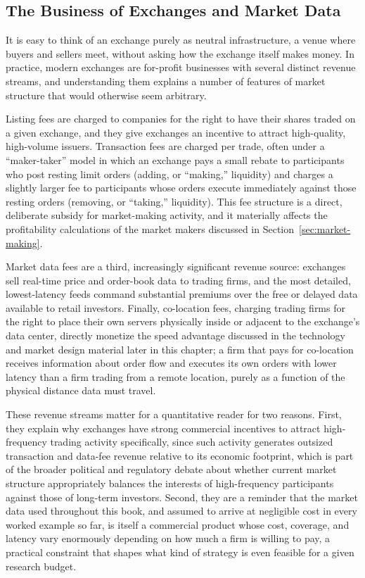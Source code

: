\documentclass[../ai_in_finance]{subfiles}
\begin{document}
\subsection{The Business of Exchanges and Market Data}

It is easy to think of an exchange purely as neutral infrastructure, a venue where buyers and sellers meet, without asking how the exchange itself makes money. In practice, modern exchanges are for-profit businesses with several distinct revenue streams, and understanding them explains a number of features of market structure that would otherwise seem arbitrary.

Listing fees are charged to companies for the right to have their shares traded on a given exchange, and they give exchanges an incentive to attract high-quality, high-volume issuers. Transaction fees are charged per trade, often under a ``maker-taker'' model in which an exchange pays a small rebate to participants who post resting limit orders (adding, or ``making,'' liquidity) and charges a slightly larger fee to participants whose orders execute immediately against those resting orders (removing, or ``taking,'' liquidity). This fee structure is a direct, deliberate subsidy for market-making activity, and it materially affects the profitability calculations of the market makers discussed in Section~\ref{sec:market-making}.

Market data fees are a third, increasingly significant revenue source: exchanges sell real-time price and order-book data to trading firms, and the most detailed, lowest-latency feeds command substantial premiums over the free or delayed data available to retail investors. Finally, co-location fees, charging trading firms for the right to place their own servers physically inside or adjacent to the exchange's data center, directly monetize the speed advantage discussed in the technology and market design material later in this chapter; a firm that pays for co-location receives information about order flow and executes its own orders with lower latency than a firm trading from a remote location, purely as a function of the physical distance data must travel.

These revenue streams matter for a quantitative reader for two reasons. First, they explain why exchanges have strong commercial incentives to attract high-frequency trading activity specifically, since such activity generates outsized transaction and data-fee revenue relative to its economic footprint, which is part of the broader political and regulatory debate about whether current market structure appropriately balances the interests of high-frequency participants against those of long-term investors. Second, they are a reminder that the market data used throughout this book, and assumed to arrive at negligible cost in every worked example so far, is itself a commercial product whose cost, coverage, and latency vary enormously depending on how much a firm is willing to pay, a practical constraint that shapes what kind of strategy is even feasible for a given research budget.
\end{document}
